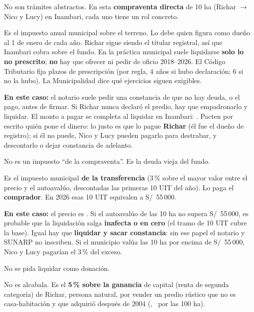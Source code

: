 \documentclass[12pt,a4paper]{article}
\begin{document}


\noindent No son trámites abstractos. En esta \textbf{compraventa directa} de 10 ha (Richar $\rightarrow$ Nico y Lucy) en Inambari, cada uno tiene un rol concreto.

Es el impuesto anual municipal sobre el terreno. Lo debe quien figura como dueño al 1 de enero de cada año. Richar sigue siendo el titular registral, así que Inambari cobra sobre el fundo. En la práctica municipal suele liquidarse \textbf{solo lo no prescrito}; \textbf{no} hay que ofrecer ni pedir de oficio 2018--2026. El Código Tributario fija plazos de prescripción (por regla, 4 años si hubo declaración; 6 si no la hubo). La Municipalidad dice qué ejercicios siguen exigibles.

\textbf{En este caso:} el notario suele pedir una constancia de que no hay deuda, o el pago, antes de firmar. Si Richar nunca declaró el predio, hay que empadronarlo y liquidar. El monto a pagar se completa al liquidar en Inambari: \DeudaPredialReferencia. Pacten por escrito quién pone el dinero: lo justo es que lo pague \textbf{Richar} (él fue el dueño de registro); si él no puede, Nico y Lucy pueden pagarlo para destrabar, y descontarlo o dejar constancia de adelanto.

No es un impuesto ``de la compraventa''. Es la deuda vieja del fundo.

Es el impuesto municipal \textbf{de la transferencia} (3\,\% sobre el mayor valor entre el precio y el autoavalúo, descontadas las primeras 10 UIT del año). Lo paga el \textbf{comprador}. En 2026 esas 10 UIT equivalen a S/\ 55\,000.

\textbf{En este caso:} el precio es \MontoPago. Si el autoavalúo de las 10 ha no supera S/\ 55\,000, es probable que la liquidación salga \textbf{inafecta o en cero} (el tramo de 10 UIT cubre la base). Igual hay que \textbf{liquidar y sacar constancia}: sin ese papel el notario y SUNARP no inscriben. Si el municipio valúa las 10 ha por encima de S/\ 55\,000, Nico y Lucy pagarían el 3\,\% del exceso.

No se pida liquidar como donación.

No es alcabala. Es el \textbf{5\,\% sobre la ganancia} de capital (renta de segunda categoría) de Richar, persona natural, por vender un predio rústico que no es casa-habitación y que adquirió después de 2004 (\FechaAdquisicionMatriz, \PrecioAdquisicionMatriz\ por las 100 ha).
\end{document}
